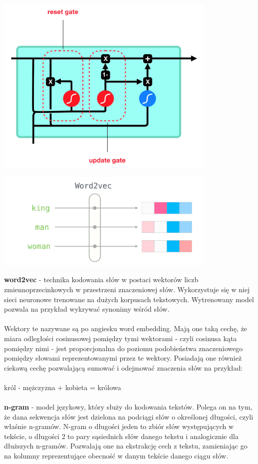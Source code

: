 \documentclass[11pt, a4paper, notitlepage]{report}
\begin{document}
\begin{itemize}
\begin{itemize}
        \begin{center}
        \includegraphics[width=300pt]{graphics/GRU gate.png}
        \end{center}
    \end{itemize}
\end{itemize}

    \begin{center}
    \includegraphics[width=300pt]{graphics/word2vec.png}
    \end{center}

{\bf word2vec} - technika kodowania słów w postaci wektorów liczb zmiennoprzecinkowych w przestrzeni znaczeniowej słów. Wykorzystuje się w niej sieci neuronowe trenowane na dużych korpusach tekstowych. Wytrenowany model pozwala na przykład wykrywać synonimy wśród słów.
\\ \\
Wektory te nazywane są po angiesku word embedding. Mają one taką cechę, że miara odległości cosinusowej pomiędzy tymi wektorami - czyli cosinusa kąta pomiędzy nimi - jest proporcjonalna do poziomu podobieństwa znaczeniowego pomiędzy słowami reprezentowanymi przez te wektory. Posiadają one również ciekawą cechę pozwalającą sumować i odejmować znaczenia słów na przykład:
\\ \\
król - mężczyzna + kobieta = królowa
\\ \\
{\bf n-gram} - model językowy, który służy do kodowania tekstów. Polega on na tym, że dana sekwencja słów jest dzielona na podciągi słów o określonej długości, czyli właśnie n-gramów. N-gram o długości jeden to zbiór słów występujących w tekście, o długości 2 to pary sąsiednich słów danego tekstu i analogicznie dla dłuższych n-gramów. Pozwalają one na ekstrakcję cech z tekstu, zamieniając go na kolumny reprezentujące obecność w danym tekście danego ciągu słów.
\end{document}
